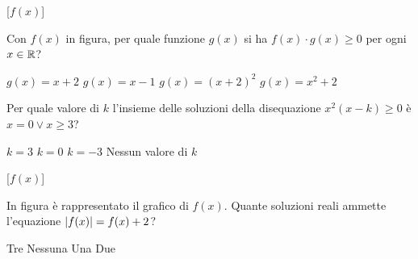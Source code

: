 \documentclass[10pt]{article}
\begin{document}
{\smallskip
\noindent
\begin{minipage}[c]{.35\linewidth}
  \centering
  \begin{ftplot}[quiz, xmin=-3.9, xmax=3.9, ymin=-3.9, ymax=3.9]
    [$f(x)$]
  \end{ftplot}
\end{minipage}\hfill
\begin{minipage}[c]{.64\linewidth}
  \begin{parts}[ragged]
    \itemx[pts=0.5, diff=3] Con $f(x)$ in figura, per quale funzione $g(x)$ si ha $f(x) \cdot g(x) \geq 0$ per ogni $x \in \spR$?
      \begin{choices}
        \correct $g(x) = x + 2$
        \choice $g(x) = x - 1$
        \choice $g(x) = (x + 2)^2$
        \choice $g(x) = x^2 + 2$
      \end{choices}
  \end{parts}
\end{minipage}

\begin{parts}
  \itemx[pts=0.5, diff=3, noreduced] Per quale valore di $k$ l'insieme delle soluzioni della disequazione $x^2(x - k) \geq 0$ è $x = 0 \lor x \geq 3$?
    \begin{choices}
      \correct $k = 3$
      \choice $k = 0$
      \choice $k = -3$
      \choice[fixed] Nessun valore di $k$
    \end{choices}
\end{parts}

\smallskip
\noindent
\begin{minipage}[c]{.35\linewidth}
  \centering
  \begin{ftplot}[quiz, xmin=-3.9, xmax=3.9, ymin=-3.9, ymax=3.9]
    [$f(x)$]
  \end{ftplot}
\end{minipage}\hfill
\begin{minipage}[c]{.64\linewidth}
  \begin{parts}[ragged]
    \itemx[pts=0.5, diff=3] In figura è rappresentato il grafico di $f(x)$. Quante soluzioni reali ammette l'equazione $\left\vert f(x) \right\vert = f(x) + 2$?
      \begin{choices}
        \correct Tre
        \choice Nessuna
        \choice Una
        \choice Due
      \end{choices}
  \end{parts}
\end{minipage}

}
\end{document}
